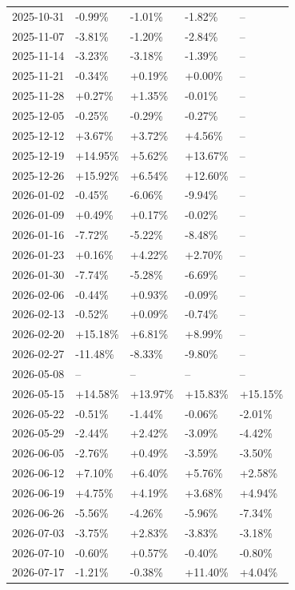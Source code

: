 \documentclass[11pt,a4paper]{article}
\begin{document}
\begin{longtable}{lllll}
2025-10-31 & -0.99\% & -1.01\% & -1.82\% & -- \\
2025-11-07 & -3.81\% & -1.20\% & -2.84\% & -- \\
2025-11-14 & -3.23\% & -3.18\% & -1.39\% & -- \\
2025-11-21 & -0.34\% & +0.19\% & +0.00\% & -- \\
2025-11-28 & +0.27\% & +1.35\% & -0.01\% & -- \\
2025-12-05 & -0.25\% & -0.29\% & -0.27\% & -- \\
2025-12-12 & +3.67\% & +3.72\% & +4.56\% & -- \\
2025-12-19 & +14.95\% & +5.62\% & +13.67\% & -- \\
2025-12-26 & +15.92\% & +6.54\% & +12.60\% & -- \\
2026-01-02 & -0.45\% & -6.06\% & -9.94\% & -- \\
2026-01-09 & +0.49\% & +0.17\% & -0.02\% & -- \\
2026-01-16 & -7.72\% & -5.22\% & -8.48\% & -- \\
2026-01-23 & +0.16\% & +4.22\% & +2.70\% & -- \\
2026-01-30 & -7.74\% & -5.28\% & -6.69\% & -- \\
2026-02-06 & -0.44\% & +0.93\% & -0.09\% & -- \\
2026-02-13 & -0.52\% & +0.09\% & -0.74\% & -- \\
2026-02-20 & +15.18\% & +6.81\% & +8.99\% & -- \\
2026-02-27 & -11.48\% & -8.33\% & -9.80\% & -- \\
2026-05-08 & -- & -- & -- & -- \\
2026-05-15 & +14.58\% & +13.97\% & +15.83\% & +15.15\% \\
2026-05-22 & -0.51\% & -1.44\% & -0.06\% & -2.01\% \\
2026-05-29 & -2.44\% & +2.42\% & -3.09\% & -4.42\% \\
2026-06-05 & -2.76\% & +0.49\% & -3.59\% & -3.50\% \\
2026-06-12 & +7.10\% & +6.40\% & +5.76\% & +2.58\% \\
2026-06-19 & +4.75\% & +4.19\% & +3.68\% & +4.94\% \\
2026-06-26 & -5.56\% & -4.26\% & -5.96\% & -7.34\% \\
2026-07-03 & -3.75\% & +2.83\% & -3.83\% & -3.18\% \\
2026-07-10 & -0.60\% & +0.57\% & -0.40\% & -0.80\% \\
2026-07-17 & -1.21\% & -0.38\% & +11.40\% & +4.04\% \\

\end{longtable}
\end{document}
